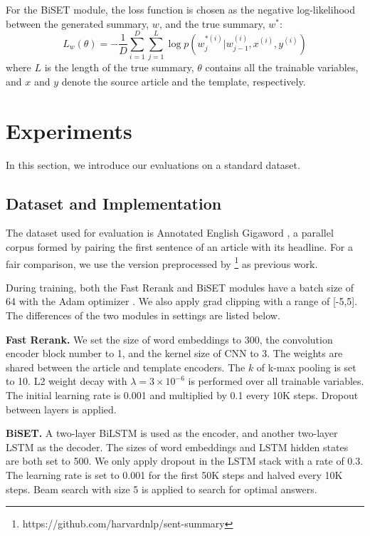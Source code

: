 \documentclass[11pt,a4paper]{article}
\begin{document}
\begin{spacing}{1.0}
For the BiSET module, the loss function is chosen as the negative log-likelihood between the generated summary, $w$, and the true summary, $w^*$:
\begin{equation}
L_w(\theta)=-\frac{1}{D}\sum\limits_{i=1}^D\sum\limits_{j=1}^L\log p(w^{*(i)}_j|w_{j-1}^{(i)},x^{(i)},y^{(i)})
\end{equation}
where $L$ is the length of the true summary, $\theta$ contains all the trainable variables, and $x$ and $y$ denote the source article and the template, respectively.

\section{Experiments}
In this section, we introduce our evaluations on a standard dataset.

\subsection{Dataset and Implementation}
The dataset used for evaluation is Annotated English Gigaword \cite{Napoles2012Annotated}, a parallel corpus formed by pairing the first sentence of an article with its headline. For a fair comparison, we use the version preprocessed by \footnote{ https://github.com/harvardnlp/sent-summary} as previous work.

During training, both the Fast Rerank and BiSET modules have a batch size of 64 with the Adam optimizer \cite{Kingma2014Adam}. We also apply grad clipping \cite{pascanu2013difficulty} with a range of [-5,5]. The differences of the two modules in settings are listed below.

\noindent\textbf{Fast Rerank.} We set the size of word embeddings to 300, the convolution encoder block number to 1, and the kernel size of CNN to 3. The weights are shared between the article and template encoders. The $k$ of k-max pooling is set to 10. L2 weight decay with $\lambda=3\times 10^{-6}$ is performed over all trainable variables. The initial learning rate is 0.001 and multiplied by 0.1 every 10K steps. Dropout between layers is applied.

\noindent\textbf{BiSET.} A two-layer BiLSTM is used as the encoder, and another two-layer LSTM as the decoder. The sizes of word embeddings and LSTM hidden states are both set to 500. We only apply dropout in the LSTM stack with a rate of 0.3. The learning rate is set to 0.001 for the first 50K steps and halved every 10K steps. Beam search with size 5 is applied to search for optimal answers.


\end{spacing}
\end{document}
